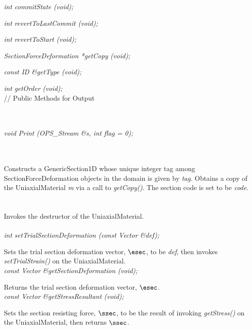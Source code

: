 {\em int commitState (void); } 

{\em int revertToLastCommit (void); } 

{\em int revertToStart (void); } 

{\em SectionForceDeformation *getCopy (void); } 

{\em const ID \&getType (void); } 

{\em int getOrder (void); } \\ 

// Public Methods for Output

\\
\\
{\em void Print (OPS_Stream \&s, int flag = 0);} 


  \\
  \\
Constructs a GenericSection1D whose unique integer tag among
SectionForceDeformation objects in the domain is given by {\em tag}. Obtains
a copy of the UniaxialMaterial {\em m} via a call to {\em getCopy()}.
The section code is set to be {\em code}. \\

 \\
\\ 
Invokes the destructor of the UniaxialMaterial. \\

 \\
{\em int setTrialSectionDeformation (const Vector \&def); }  

Sets the trial section deformation vector, $\esec$, to be {\em def}, then invokes
{\em setTrialStrain()} on the UniaxialMaterial. \\

{\em const Vector \&getSectionDeformation (void); } 

Returns the trial section deformation vector, $\esec$. \\

{\em const Vector \&getStressResultant (void); } 

Sets the section resisting force, $\ssec$, to be the result of invoking 
{\em getStress()} on the UniaxialMaterial, then returns $\ssec$. \\


